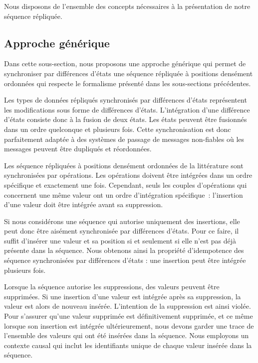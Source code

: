 Nous disposons de l'ensemble des concepts nécessaires à la présentation de notre séquence répliquée.


\subsection{Approche générique}

Dans cette sous-section, nous proposons une approche générique qui permet de synchroniser par différences d'états une séquence répliquée à positions densément ordonnées qui respecte le formalisme présenté dans les sous-sections précédentes.

Les types de données répliqués synchronisés par différences d'états représentent les modifications sous forme de différences d'états.
L'intégration d'une différence d'états consiste donc à la fusion de deux états.
Les états peuvent être fusionnés dans un ordre quelconque et plusieurs fois.
Cette synchronisation est donc parfaitement adaptée à des systèmes de passage de messages non-fiables où les messages peuvent être dupliqués et réordonnées.

Les séquence répliquées à positions densément ordonnées de la littérature sont synchronisées par opérations.
Les opérations doivent être intégrées dans un ordre spécifique et exactement une fois.
Cependant, seuls les couples d'opérations qui concernent une même valeur ont un ordre d'intégration spécifique~: l'insertion d'une valeur doit être intégrée avant sa suppression.

Si nous considérons une séquence qui autorise uniquement des insertions, elle peut donc être aisément synchronisée par différences d'états.
Pour ce faire, il suffit d'insérer une valeur et sa position si et seulement si elle n'est pas déjà présente dans la séquence.
Nous obtenons ainsi la propriété d'idempotence des séquence synchronisées par différences d'états : une insertion peut être intégrée plusieurs fois.

Lorsque la séquence autorise les suppressions, des valeurs peuvent être supprimées.
Si une insertion d'une valeur est intégrée après sa suppression, la valeur est alors de nouveau insérée.
L'intention de la suppression est ainsi violée.
Pour s'assurer qu'une valeur supprimée est définitivement supprimée, et ce même lorsque son insertion est intégrée ultérieurement, nous devons garder une trace de l'ensemble des valeurs qui ont été insérées dans la séquence.
Nous employons un contexte causal qui inclut les identifiants unique de chaque valeur insérée dans la séquence.

